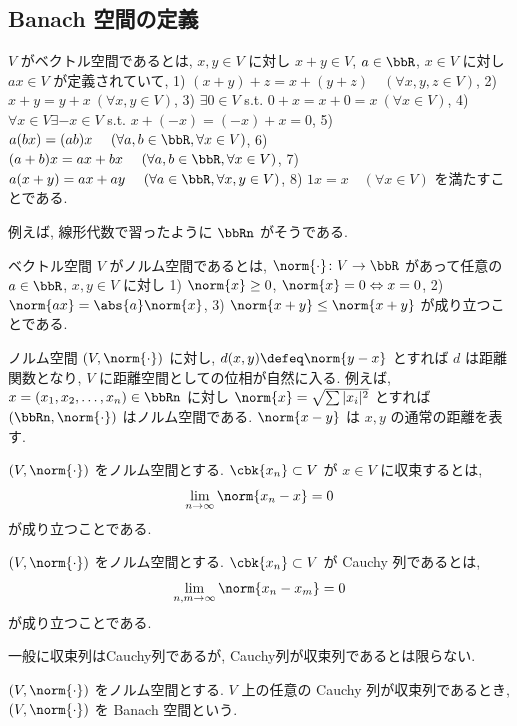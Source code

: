 \documentclass[openany, a4paper, oneside]{jsbook}
\begin{document}
\subsection{Banach 空間の定義}

\begin{defn}
 $V$ がベクトル空間であるとは, $x, y \in V$ に対し $x + y \in V$,
 $a \in \bbR$, $x \in V$ に対し $a x \in V$ が定義されていて,
  1) $(x + y) + z = x + (y + z) \quad (\forall x, y, z \in V)$,
  2) $x+y=y+x\ (\forall x, y\in V)$,
  3) $\exists 0 \in V$ s.t. $0+x=x+0=x\ (\forall x \in V)$,
  4) $\forall x \in V \exists -x \in V$ s.t. $x+(-x)=(-x)+x=0$,
  5) $a(bx)=(ab)x\ \quad (\forall a, b \in \bbR, \forall x \in V)$,
  6) $(a+b)x=ax+bx\ \quad (\forall a, b \in \bbR, \forall x \in V)$,
  7) $a(x+y)=ax+ay\ \quad (\forall a \in \bbR, \forall x, y\in V)$,
  8) $1x=x \quad (\forall x \in V)$
 を満たすことである.
\end{defn}
\begin{ex}
例えば, 線形代数で習ったように $\bbRn$ がそうである.
\end{ex}
\begin{defn}
 ベクトル空間 $V$ がノルム空間であるとは, $\norm{\cdot} \colon V \to \bbR$ があって任意の $a \in \bbR$, $x, y\in V$ に対し
  1) $\norm{x} \geq0$, $\norm{x} = 0 \Leftrightarrow x = 0$,
  2) $\norm{ax} = \abs{a} \norm{x}$,
  3) $\norm{x + y} \leq \norm{x + y}$
 が成り立つことである.
\end{defn}
\begin{rem}
ノルム空間 $(V, \norm{\cdot})$ に対し, $d(x, y) \defeq \norm{y - x}$ とすれば $d$ は距離関数となり,
$V$ に距離空間としての位相が自然に入る.
例えば, $x=(x_1, x_2, \dots, x_n) \in \bbRn$ に対し
$\norm{x} = \sqrt{\sum |x_i|^2}$ とすれば $(\bbRn, \norm{\cdot})$ はノルム空間である.
$\norm{x - y}$ は $x, y$ の通常の距離を表す.
\end{rem}

\begin{defn}
 $(V, \norm{\cdot})$ をノルム空間とする.
 $\cbk{x_n} \subset V$ が $x \in V$ に収束するとは,
 \begin{align*}
  \lim_{n \to \infty} \norm{x_n - x}
  =
  0
 \end{align*}
が成り立つことである.
\end{defn}
\begin{defn}
 $(V, \norm{\cdot})$ をノルム空間とする.
 $\cbk{x_n} \subset V$ が Cauchy 列であるとは,
  \begin{align*}
   \lim_{n, m \to \infty} \norm{x_n - x_m}
   =
   0
  \end{align*}
 が成り立つことである.
\end{defn}
\begin{rem}
一般に収束列はCauchy列であるが, Cauchy列が収束列であるとは限らない.
\end{rem}
\begin{defn}
 $(V, \norm{\cdot})$ をノルム空間とする.
 $V$ 上の任意の Cauchy 列が収束列であるとき, $(V, \norm{\cdot})$ を Banach 空間という.
\end{defn}
\end{document}
